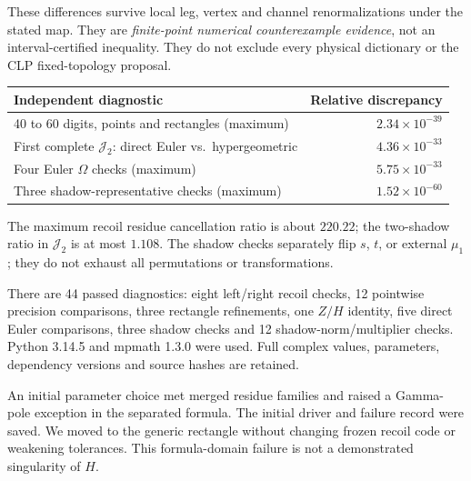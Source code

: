 \documentclass[11pt,a4paper]{article}
\newcommand{\J}{\mathcal J_2}
\begin{document}
These differences survive local leg, vertex and channel
renormalizations under the stated map. They are
\emph{finite-point numerical counterexample evidence}, not an
interval-certified inequality. They do not exclude every physical
dictionary or the CLP fixed-topology proposal.
\begin{center}
\begin{tabular}{lr}
\toprule
Independent diagnostic & Relative discrepancy\\
\midrule
40 to 60 digits, points and rectangles (maximum) & $2.34\times10^{-39}$\\
First complete $\J$: direct Euler vs.\ hypergeometric & $4.36\times10^{-33}$\\
Four Euler $\Omega$ checks (maximum) & $5.75\times10^{-33}$\\
Three shadow-representative checks (maximum) & $1.52\times10^{-60}$\\
\bottomrule
\end{tabular}
\end{center}
The maximum recoil residue cancellation ratio is about $220.22$;
the two-shadow ratio in $\J$ is at most $1.108$.
The shadow checks separately flip $s$, $t$, or external $\mu_1$;
they do not exhaust all permutations or transformations.

There are 44 passed diagnostics: eight left/right recoil checks,
12 pointwise precision comparisons, three rectangle refinements,
one $Z/H$ identity, five direct Euler comparisons, three shadow
checks and 12 shadow-norm/multiplier checks.
Python 3.14.5 and mpmath 1.3.0 were used. Full complex values,
parameters, dependency versions and source hashes are retained.

An initial parameter choice met merged residue families and raised
a Gamma-pole exception in the separated formula. The initial driver
and failure record were saved. We moved to the generic rectangle
without changing frozen recoil code or weakening tolerances.
This formula-domain failure is not a demonstrated singularity of $H$.

\newpage
\end{document}
